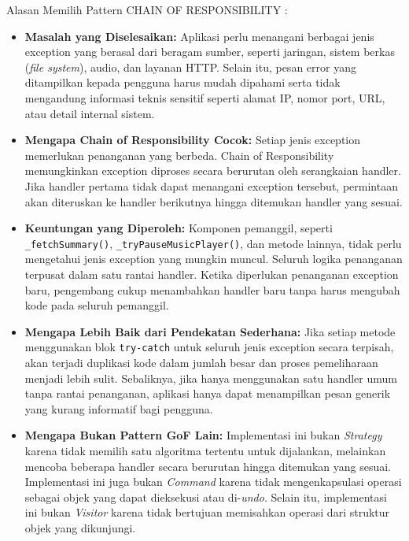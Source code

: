 \documentclass[11pt]{article}
\begin{document}
Alasan Memilih Pattern CHAIN OF RESPONSIBILITY :
\begin{itemize}

\item \textbf{Masalah yang Diselesaikan:} Aplikasi perlu menangani berbagai jenis exception yang berasal dari beragam sumber, seperti jaringan, sistem berkas (\textit{file system}), audio, dan layanan HTTP. Selain itu, pesan error yang ditampilkan kepada pengguna harus mudah dipahami serta tidak mengandung informasi teknis sensitif seperti alamat IP, nomor port, URL, atau detail internal sistem.

\item \textbf{Mengapa Chain of Responsibility Cocok:} Setiap jenis exception memerlukan penanganan yang berbeda. Chain of Responsibility memungkinkan exception diproses secara berurutan oleh serangkaian handler. Jika handler pertama tidak dapat menangani exception tersebut, permintaan akan diteruskan ke handler berikutnya hingga ditemukan handler yang sesuai.

\item \textbf{Keuntungan yang Diperoleh:} Komponen pemanggil, seperti \texttt{\_fetchSummary()}, \texttt{\_tryPauseMusicPlayer()}, dan metode lainnya, tidak perlu mengetahui jenis exception yang mungkin muncul. Seluruh logika penanganan terpusat dalam satu rantai handler. Ketika diperlukan penanganan exception baru, pengembang cukup menambahkan handler baru tanpa harus mengubah kode pada seluruh pemanggil.

\item \textbf{Mengapa Lebih Baik dari Pendekatan Sederhana:} Jika setiap metode menggunakan blok \texttt{try-catch} untuk seluruh jenis exception secara terpisah, akan terjadi duplikasi kode dalam jumlah besar dan proses pemeliharaan menjadi lebih sulit. Sebaliknya, jika hanya menggunakan satu handler umum tanpa rantai penanganan, aplikasi hanya dapat menampilkan pesan generik yang kurang informatif bagi pengguna.

\item \textbf{Mengapa Bukan Pattern GoF Lain:} Implementasi ini bukan \textit{Strategy} karena tidak memilih satu algoritma tertentu untuk dijalankan, melainkan mencoba beberapa handler secara berurutan hingga ditemukan yang sesuai. Implementasi ini juga bukan \textit{Command} karena tidak mengenkapsulasi operasi sebagai objek yang dapat dieksekusi atau di-\textit{undo}. Selain itu, implementasi ini bukan \textit{Visitor} karena tidak bertujuan memisahkan operasi dari struktur objek yang dikunjungi.
\end{itemize}
\end{document}
